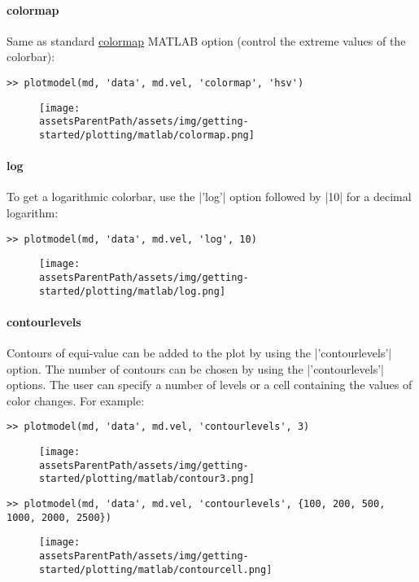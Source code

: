 \paragraph{colormap}
Same as standard \href{http://www.mathworks.com/access/helpdesk/help/techdoc/index.html?/access/helpdesk/help/techdoc/ref/colormap.html}{colormap} MATLAB option (control the extreme values of the colorbar):
\begin{lstlisting}
>> plotmodel(md, 'data', md.vel, 'colormap', 'hsv')
\end{lstlisting}
\begin{figure}[H]
	\begin{center}
		\texttt{[image: \\assetsParentPath/assets/img/getting-started/plotting/matlab/colormap.png]}
	\end{center}
\end{figure}

\paragraph{log}
To get a logarithmic colorbar, use the \lstinlinebg|'log'| option followed by \lstinlinebg|10| for a decimal logarithm:
\begin{lstlisting}
>> plotmodel(md, 'data', md.vel, 'log', 10)
\end{lstlisting}
\begin{figure}[H]
	\begin{center}
		\texttt{[image: \\assetsParentPath/assets/img/getting-started/plotting/matlab/log.png]}
	\end{center}
\end{figure}

\paragraph{contourlevels}
Contours of equi-value can be added to the plot by using the \lstinlinebg|'contourlevels'| option. The number of contours can be chosen by using the \lstinlinebg|'contourlevels'| options. The user can specify a number of levels or a cell containing the values of color changes. For example:
\begin{lstlisting}
>> plotmodel(md, 'data', md.vel, 'contourlevels', 3)
\end{lstlisting}
\begin{figure}[H]
	\begin{center}
		\texttt{[image: \\assetsParentPath/assets/img/getting-started/plotting/matlab/contour3.png]}
	\end{center}
\end{figure}
\begin{lstlisting}
>> plotmodel(md, 'data', md.vel, 'contourlevels', {100, 200, 500, 1000, 2000, 2500})
\end{lstlisting}
\begin{figure}[H]
	\begin{center}
		\texttt{[image: \\assetsParentPath/assets/img/getting-started/plotting/matlab/contourcell.png]}
	\end{center}
\end{figure}

